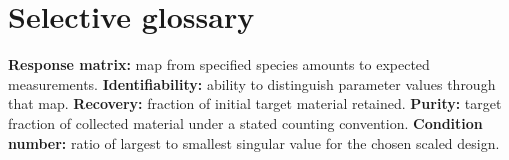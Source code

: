 \section*{Selective glossary}
\textbf{Response matrix:} map from specified species amounts to expected measurements.
\textbf{Identifiability:} ability to distinguish parameter values through that map.
\textbf{Recovery:} fraction of initial target material retained.
\textbf{Purity:} target fraction of collected material under a stated counting convention.
\textbf{Condition number:} ratio of largest to smallest singular value for the chosen scaled design.
